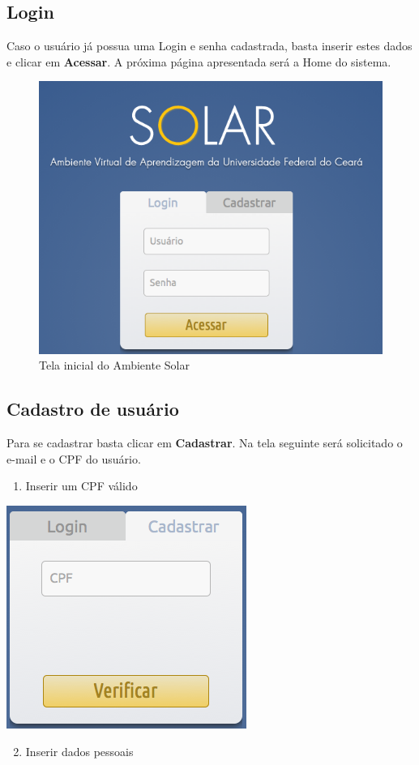 \documentclass[letterpaper,10pt,english]{sphinxmanual}
\begin{document}
\subsection{Login}
\label{access:login}\label{access:id1}
Caso o usuário já possua uma Login e senha cadastrada, basta inserir estes dados e clicar em \textbf{Acessar}. A próxima página apresentada será a Home do sistema.
\begin{figure}[htbp]
\centering
\capstart

\includegraphics{login-01.png}
\caption{Tela inicial do Ambiente Solar}\end{figure}


\subsection{Cadastro de usuário}
\label{access:cadastro}\label{access:cadastro-de-usuario}
Para se cadastrar basta clicar em \textbf{Cadastrar}. Na tela seguinte será solicitado o e-mail e o CPF do usuário.
\begin{enumerate}
\item {} 
Inserir um CPF válido

\end{enumerate}

{\hfill\includegraphics{register-01.png}\hfill}
\begin{enumerate}
\setcounter{enumi}{1}
\item {} 
Inserir dados pessoais

\end{enumerate}
\end{document}
